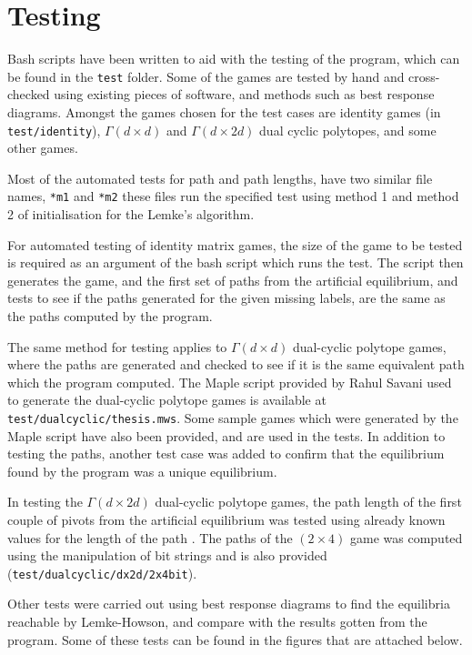 \section{Testing}
Bash scripts have been written to aid with the testing of the program,
which can be found in the \verb|test| folder. Some of the games are tested
by hand and cross-checked using existing pieces of software, and methods
such as best response diagrams. Amongst the games chosen for the test cases
are identity games (in \verb|test/identity|), $\Gamma(d \times d)$ and 
$\Gamma(d \times 2d)$ dual cyclic polytopes, and some other games.

Most of the automated tests for path and path lengths, have two similar
file names, \verb|*m1| and \verb|*m2| these files run the specified
test using method 1 and method 2 of initialisation for the Lemke's algorithm.

For automated testing of identity matrix games, the size of the game to be tested
is required as an argument of the bash script which runs the test. The script then
generates the game, and the first set of paths from the artificial equilibrium,
and tests to see if the paths generated for the given missing labels, are the same
as the paths computed by the program.

The same method for testing applies to $\Gamma(d\times d)$ dual-cyclic polytope
games, where the paths are generated and checked to see if it is the same 
equivalent path which the program computed. The Maple script provided by Rahul
Savani used to generate
the dual-cyclic polytope games is available at \verb|test/dualcyclic/thesis.mws|.
Some sample games which were generated by the Maple script have also been provided,
and are used in the tests. In addition to testing the paths, another test case was
added to confirm that the equilibrium found by the program was a unique equilibrium.

In testing the $\Gamma(d \times 2d)$ dual-cyclic polytope games, the path length of
the first couple of pivots from the artificial equilibrium was tested using already known
values for the length of the path \cite{rahul}. The paths of the $(2 \times 4)$ game was computed
using the manipulation of bit strings and is also provided 
(\verb|test/dualcyclic/dx2d/2x4bit|).

Other tests were carried out using best response diagrams to find the equilibria
reachable by Lemke-Howson, and compare with the results gotten from the program.
Some of these tests can be found in the figures that are attached below.

